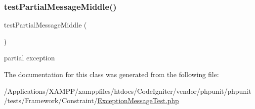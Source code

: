 \subsubsection{\texorpdfstring{test\+Partial\+Message\+Middle()}{testPartialMessageMiddle()}}
{\footnotesize\ttfamily test\+Partial\+Message\+Middle (\begin{DoxyParamCaption}{ }\end{DoxyParamCaption})}

partial exception 

The documentation for this class was generated from the following file\+:\begin{DoxyCompactItemize}
\item 
/\+Applications/\+X\+A\+M\+P\+P/xamppfiles/htdocs/\+Code\+Igniter/vendor/phpunit/phpunit/tests/\+Framework/\+Constraint/\mbox{\hyperlink{_exception_message_test_8php}{Exception\+Message\+Test.\+php}}\end{DoxyCompactItemize}
